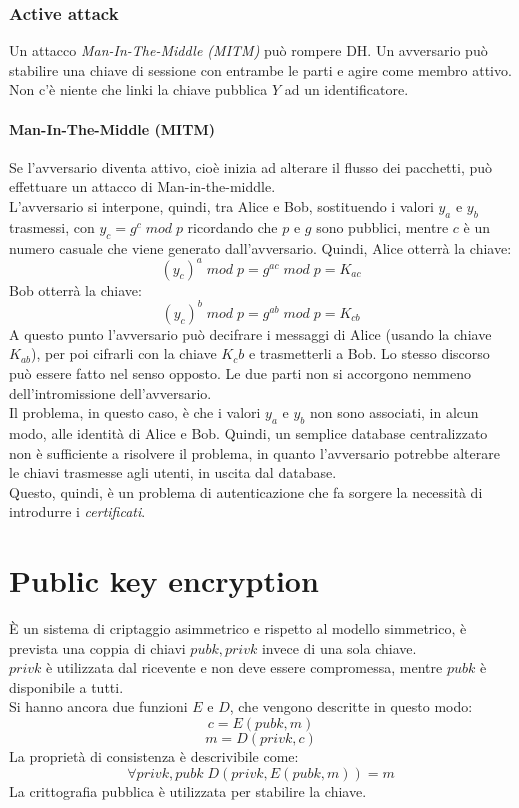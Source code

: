 \documentclass[a4paper,12pt]{article}
\begin{document}
\subsubsection{Active attack}
Un attacco \textit{Man-In-The-Middle (MITM)} può rompere DH. Un avversario può stabilire una chiave di sessione con entrambe le parti e agire come membro attivo. Non c'è niente che linki la chiave pubblica $Y$ ad un identificatore.

\paragraph{Man-In-The-Middle (MITM)} Se l'avversario diventa attivo, cioè inizia ad alterare il flusso dei pacchetti, può effettuare un attacco di Man-in-the-middle. \\
L'avversario si interpone, quindi, tra Alice e Bob, sostituendo i valori $y_a$ e $y_b$ trasmessi, con $y_c = g^c\;mod\;p$ ricordando che $p$ e $g$ sono pubblici, mentre $c$ è un numero casuale che viene generato dall'avversario.
Quindi, Alice otterrà la chiave: $$(y_c)^a\;mod\;p = g^{ac}\;mod\;p = K_{ac}$$
Bob otterrà la chiave: $$(y_c)^b\;mod\;p = g^{ab}\;mod\;p = K_{cb}$$
A questo punto l'avversario può decifrare i messaggi di Alice (usando la chiave $K_{ab}$), per poi cifrarli con la chiave $K_cb$ e trasmetterli a Bob. 
Lo stesso discorso può essere fatto nel senso opposto. Le due parti non si accorgono nemmeno dell'intromissione dell'avversario. \\
Il problema, in questo caso, è che i valori $y_a$ e $y_b$ non sono associati, in alcun modo, alle identità di Alice e Bob. Quindi, un semplice database centralizzato non è sufficiente a risolvere il problema, in quanto l'avversario potrebbe alterare le chiavi trasmesse agli utenti, in uscita dal database. \\
Questo, quindi, è un problema di autenticazione che fa sorgere la necessità di introdurre i \textit{certificati}.

\newpage

\section{Public key encryption}
È un sistema di criptaggio asimmetrico e rispetto al modello simmetrico, è prevista una coppia di chiavi $pubk,privk$ invece di una sola chiave. \\
$privk$ è utilizzata dal ricevente e non deve essere compromessa, mentre $pubk$ è disponibile a tutti. \\
Si hanno ancora due funzioni $E$ e $D$, che vengono descritte in questo modo:
$$c = E(pubk,m)$$
$$m = D(privk,c)$$
La proprietà di consistenza è descrivibile come:
$$\forall privk,pubk \; D(privk, E(pubk,m)) = m$$
La crittografia pubblica è utilizzata per stabilire la chiave.
\end{document}

